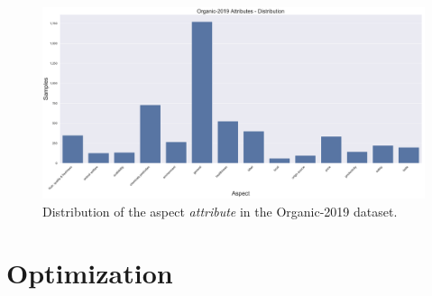 \begin{figure}[H]
	\centering
	\includegraphics[width=\textwidth]{figures/05_setup/05_organicAttributes}
	\caption{Distribution of the aspect \textit{attribute} in the Organic-2019 dataset.}
	\label{fig:05_organic2019_Attributes}
\end{figure}

	

\section{Optimization}

